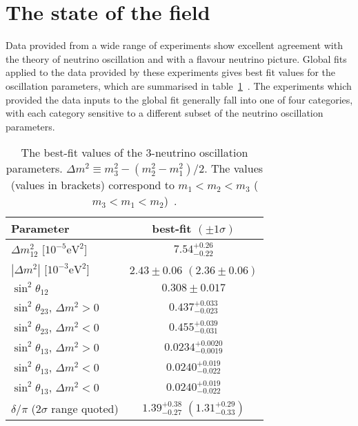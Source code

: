 \section{The state of the field}
\label{sec:StateOfTheField}
Data provided from a wide range of experiments show excellent agreement with the theory of neutrino oscillation and with a flavour neutrino picture.  Global fits applied to the data provided by these experiments gives best fit values for the oscillation parameters, which are summarised in table~\ref{table:NeutrinoOscillationParameterValues}~\cite{Agashe:2014kda}.  The experiments which provided the data inputs to the global fit generally fall into one of four categories, with each category sensitive to a different subset of the neutrino oscillation parameters.
\begin{table}
  \begin{tabular}{l c }
    Parameter & best-fit $(\pm1\sigma)$ \\ \hline \hline
    $\Delta m^2_{12}$ [$10^{-5}\textrm{eV}^2$] & $7.54^{+0.26}_{-0.22}$ \\
    $|\Delta m^2|$ [$10^{-3}\textrm{eV}^2$] & $2.43\pm0.06$ $(2.36\pm0.06)$ \\
    $\sin^2\theta_{12}$ & $0.308\pm0.017$ \\
    $\sin^2\theta_{23}$, $\Delta m^2 > 0$ & $0.437^{+0.033}_{-0.023}$ \\
    $\sin^2\theta_{23}$, $\Delta m^2 < 0$ & $0.455^{+0.039}_{-0.031}$ \\
    $\sin^2\theta_{13}$, $\Delta m^2 > 0$ & $0.0234^{+0.0020}_{-0.0019}$ \\
    $\sin^2\theta_{13}$, $\Delta m^2 < 0$ & $0.0240^{+0.019}_{-0.022}$ \\
    $\sin^2\theta_{13}$, $\Delta m^2 < 0$ & $0.0240^{+0.019}_{-0.022}$ \\
    $\delta/\pi$ ($2\sigma$ range quoted) & $1.39^{+0.38}_{-0.27}$ $(1.31^{+0.29}_{-0.33})$ \\
  \end{tabular}
  \caption{The best-fit values of the 3-neutrino oscillation parameters. $\Delta m^2 \equiv m^2_3 - \left(m^2_2 - m^2_1\right)/2$. The values (values in brackets) correspond to $m_1 < m_2 < m_3$ ($m_3 < m_1 < m_2$)~\cite{Agashe:2014kda}.}
  \label{table:NeutrinoOscillationParameterValues}
\end{table}
\newline
